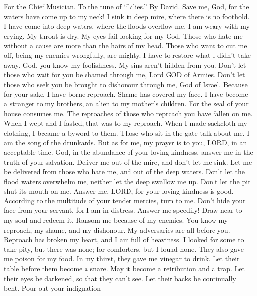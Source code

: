 For the Chief Musician. To the tune of ``Lilies.'' By David.
 Save me, God, for the waters have come up to my neck!
 I sink in deep mire, where there is no foothold. I have
come into deep waters, where the floods overflow me.  I am
weary with my crying. My throat is dry. My eyes fail looking for my God.
 Those who hate me without a cause are more than the hairs
of my head. Those who want to cut me off, being my enemies wrongfully,
are mighty. I have to restore what I didn't take away.  God,
you know my foolishness. My sins aren't hidden from you. 
Don't let those who wait for you be shamed through me, Lord GOD of
Armies. Don't let those who seek you be brought to dishonour through me,
God of Israel.  Because for your sake, I have borne
reproach. Shame has covered my face.  I have become a
stranger to my brothers, an alien to my mother's children. 
For the zeal of your house consumes me. The reproaches of those who
reproach you have fallen on me.  When I wept and I fasted,
that was to my reproach.  When I made sackcloth my
clothing, I became a byword to them.  Those who sit in the
gate talk about me. I am the song of the drunkards.  But as
for me, my prayer is to you, LORD, in an acceptable time. God, in the
abundance of your loving kindness, answer me in the truth of your
salvation.  Deliver me out of the mire, and don't let me
sink. Let me be delivered from those who hate me, and out of the deep
waters.  Don't let the flood waters overwhelm me, neither
let the deep swallow me up. Don't let the pit shut its mouth on me.
 Answer me, LORD, for your loving kindness is good.
According to the multitude of your tender mercies, turn to me.
 Don't hide your face from your servant, for I am in
distress. Answer me speedily!  Draw near to my soul and
redeem it. Ransom me because of my enemies.  You know my
reproach, my shame, and my dishonour. My adversaries are all before you.
 Reproach has broken my heart, and I am full of heaviness.
I looked for some to take pity, but there was none; for comforters, but
I found none.  They also gave me poison for my food. In my
thirst, they gave me vinegar to drink.  Let their table
before them become a snare. May it become a retribution and a trap.
 Let their eyes be darkened, so that they can't see. Let
their backs be continually bent.  Pour out your indignation
